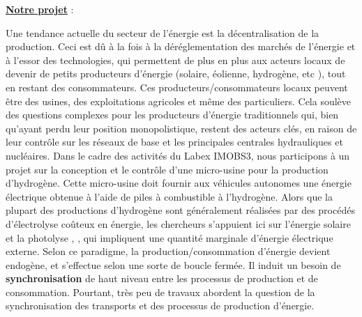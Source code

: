 
\underline{\textbf{Notre projet}} :

Une tendance actuelle du secteur de l'énergie est la décentralisation de la production. Ceci est dû à la fois à la déréglementation des marchés de l'énergie et à l'essor des technologies, qui permettent de plus en plus aux acteurs locaux de devenir de petits producteurs d'énergie (solaire, éolienne, hydrogène, etc ), tout en restant des consommateurs. Ces producteurs/consommateurs locaux peuvent être des usines, des exploitations agricoles et même des particuliers. Cela soulève des questions complexes pour les producteurs d'énergie traditionnels qui, bien qu'ayant perdu leur position monopolistique, restent des acteurs clés, en raison de leur contrôle sur les réseaux de base et les principales centrales hydrauliques et nucléaires.
Dans le cadre des activités du Labex IMOBS3, nous participons à un projet sur la conception et le contrôle d'une micro-usine pour la production d'hydrogène. Cette micro-usine doit fournir aux véhicules autonomes une énergie électrique obtenue à l'aide de piles à combustible à l'hydrogène. Alors que la plupart des productions d'hydrogène sont généralement réalisées par des procédés d'électrolyse coûteux en énergie, les chercheurs s'appuient ici sur l'énergie solaire et la photolyse  \cite{article_hydro_elect_hybrid1}, \cite{Grimes}, qui impliquent une quantité marginale d'énergie électrique externe. Selon ce paradigme, la production/consommation d'énergie devient endogène, et s'effectue selon une sorte de boucle fermée. Il induit un besoin de \textbf{synchronisation} de haut niveau entre les processus de production et de consommation. Pourtant, très peu de travaux abordent la question de la synchronisation des transports  \cite{article_synchro2} et des processus de production d'énergie.



